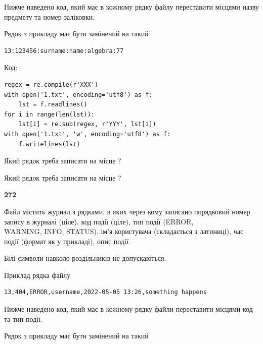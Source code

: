 Нижче наведено код, який має в кожному рядку файлу переставити місцями назву предмету та номер заліковки.

Рядок з прикладу має бути замінений на такий



\begin{verbatim}
13:123456:surname:name:algebra:77
\end{verbatim}




Код:



\begin{verbatim}
regex = re.compile(r'XXX')
with open('1.txt', encoding='utf8') as f:
    lst = f.readlines()
for i in range(len(lst)):
    lst[i] = re.sub(regex, r'YYY', lst[i])
with open('1.txt', 'w', encoding='utf8') as f:
    f.writelines(lst)
\end{verbatim}







Який рядок треба записати на місце  ?\par
\vspace{5mm}


Який рядок треба записати на місце  ?\par


\newpage

{\begin {center}\textbf{ 272}\end {center}}\par
Файл  містить журнал з рядками, в яких через кому записано поряд\-ко\-вий номер запису в журналі (ціле), код події (ціле), тип події (ERROR,\\ WARNING, INFO, STATUS), ім'я користувача (складається з латиниці), час події (фор\-мат як у прикладі), опис події.

Білі символи навколо роздільників не допускаються.

Приклад рядка файлу



\begin{verbatim}
13,404,ERROR,username,2022-05-05 13:26,something happens
\end{verbatim}


Нижче наведено код, який має в кожному рядку файли переставити місцями код та тип події.

Рядок з прикладу має бути замінений на такий



